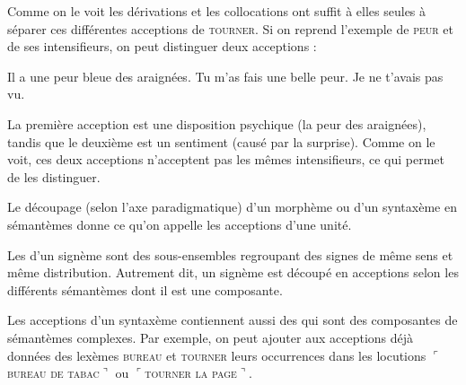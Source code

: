 Comme on le voit les dérivations et les collocations ont suffit à elles seules à séparer ces différentes acceptions de \textsc{tourner}. Si on reprend l’exemple de \textsc{peur} et de ses intensifieurs, on peut distinguer deux acceptions :

\ea
    \ea Il a une peur bleue des araignées.
    \ex Tu m’as fais une belle peur. Je ne t’avais pas vu.
\z
\ex
{}
\z
\z

La première acception est une disposition psychique (la peur des araignées), tandis que le deuxième est un sentiment (causé par la surprise). Comme on le voit, ces deux acceptions n’acceptent pas les mêmes intensifieurs, ce qui permet de les distinguer.

Le découpage (selon l’axe paradigmatique) d’un morphème ou d’un syntaxème en sémantèmes donne ce qu’on appelle les acceptions d’une unité.

{Les  d’un signème sont des sous-ensembles regroupant des signes de même sens et même distribution. Autrement dit, un signème est découpé en acceptions selon les différents sémantèmes dont il est une composante.}

Les acceptions d’un syntaxème contiennent aussi des  qui sont des composantes de sémantèmes complexes. Par exemple, on peut ajouter aux acceptions déjà données des lexèmes \textsc{bureau} et \textsc{tourner} leurs occurrences dans les locutions $⌜$\textsc{bureau} \textsc{de} \textsc{tabac}$⌝$ ou $⌜$\textsc{tourner} \textsc{la} \textsc{page}$⌝$.

